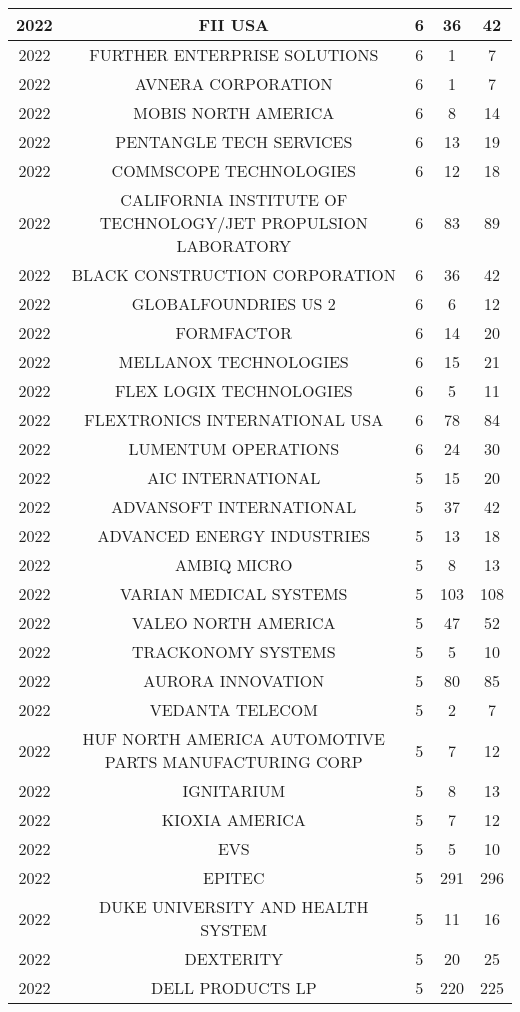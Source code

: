 \documentclass{article}%
\begin{document}
\begin{longtable}{c|c|c|c|c}
\hline%
2022&FII USA&6&36&42\\%
\hline%
2022&FURTHER ENTERPRISE SOLUTIONS&6&1&7\\%
\hline%
2022&AVNERA CORPORATION&6&1&7\\%
\hline%
2022&MOBIS NORTH AMERICA&6&8&14\\%
\hline%
2022&PENTANGLE TECH SERVICES&6&13&19\\%
\hline%
2022&COMMSCOPE TECHNOLOGIES&6&12&18\\%
\hline%
2022&CALIFORNIA INSTITUTE OF TECHNOLOGY/JET PROPULSION LABORATORY&6&83&89\\%
\hline%
2022&BLACK CONSTRUCTION CORPORATION&6&36&42\\%
\hline%
2022&GLOBALFOUNDRIES US 2&6&6&12\\%
\hline%
2022&FORMFACTOR&6&14&20\\%
\hline%
2022&MELLANOX TECHNOLOGIES&6&15&21\\%
\hline%
2022&FLEX LOGIX TECHNOLOGIES&6&5&11\\%
\hline%
2022&FLEXTRONICS INTERNATIONAL USA&6&78&84\\%
\hline%
2022&LUMENTUM OPERATIONS&6&24&30\\%
\hline%
2022&AIC INTERNATIONAL&5&15&20\\%
\hline%
2022&ADVANSOFT INTERNATIONAL&5&37&42\\%
\hline%
2022&ADVANCED ENERGY INDUSTRIES&5&13&18\\%
\hline%
2022&AMBIQ MICRO&5&8&13\\%
\hline%
2022&VARIAN MEDICAL SYSTEMS&5&103&108\\%
\hline%
2022&VALEO NORTH AMERICA&5&47&52\\%
\hline%
2022&TRACKONOMY SYSTEMS&5&5&10\\%
\hline%
2022&AURORA INNOVATION&5&80&85\\%
\hline%
2022&VEDANTA TELECOM&5&2&7\\%
\hline%
2022&HUF NORTH AMERICA AUTOMOTIVE PARTS MANUFACTURING CORP&5&7&12\\%
\hline%
2022&IGNITARIUM&5&8&13\\%
\hline%
2022&KIOXIA AMERICA&5&7&12\\%
\hline%
2022&EVS&5&5&10\\%
\hline%
2022&EPITEC&5&291&296\\%
\hline%
2022&DUKE UNIVERSITY AND HEALTH SYSTEM&5&11&16\\%
\hline%
2022&DEXTERITY&5&20&25\\%
\hline%
2022&DELL PRODUCTS LP&5&220&225\\%

\end{longtable}
\end{document}
